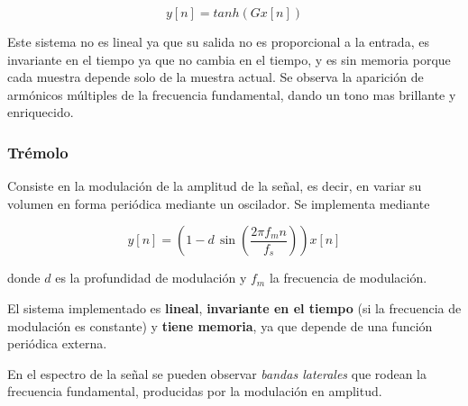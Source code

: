 \documentclass[12pt]{article}
\begin{document}
\[
y[n] = tanh(Gx[n])
\]

Este sistema no es lineal ya que su salida no es proporcional a la entrada, es invariante en el tiempo ya que no cambia en el tiempo, y es sin memoria porque cada muestra depende solo de la muestra actual.
Se observa la aparición de armónicos múltiples de la frecuencia fundamental, dando un tono mas brillante y enriquecido.

\subsubsection{Trémolo}

Consiste en la modulación de la amplitud de la señal, es decir, en variar su volumen en forma periódica mediante un oscilador. Se implementa mediante

\[
y[n] = \left( 1 - d \, \sin\left( \frac{2\pi f_m n}{f_s} \right) \right) x[n]
\]

donde $d$ es la profundidad de modulación y $f_m$ la frecuencia de modulación.

El sistema implementado es \textbf{lineal}, \textbf{invariante en el tiempo} (si la frecuencia de modulación es constante) y \textbf{tiene memoria}, ya que depende de una función periódica externa.  

En el espectro de la señal se pueden observar \textit{bandas laterales} que rodean la frecuencia fundamental, producidas por la modulación en amplitud.
\end{document}
